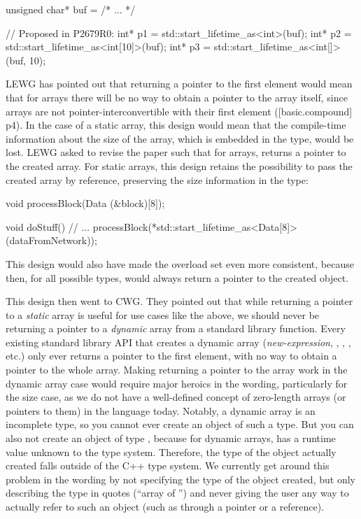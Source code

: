 \begin{codeblock}
unsigned char* buf = /* ... */

// Proposed in P2679R0:
int* p1 = std::start_lifetime_as<int>(buf);
int* p2 = std::start_lifetime_as<int[10]>(buf);
int* p3 = std::start_lifetime_as<int[]>(buf, 10);
\end{codeblock}

LEWG has pointed out that returning a pointer to the first element would mean that for arrays there will be no way to obtain a pointer to the array itself, since arrays are not pointer-interconvertible with their first element ([basic.compound] p4). In the case of a static array, this design would mean that the compile-time information about the size of the array, which is embedded in the type, would be lost. LEWG asked to revise the paper such that for arrays, \mbox{} returns a pointer to the created array. For static arrays, this design retains the possibility to pass the created array by reference, preserving the size information in the type:

\pagebreak %

\begin{codeblock}
void processBlock(Data (&block)[8]);

void doStuff() {
  // ...
  processBlock(*std::start_lifetime_as<Data[8]>(dataFromNetwork));
}
\end{codeblock}

This design would also have made the overload set even more consistent, because then, for all possible types, \mbox{} would always return a pointer to the created object.

This design then went to CWG. They pointed out that while returning a pointer to a \emph{static} array is useful for use cases like the above, we should never be returning a pointer to a \emph{dynamic} array from a standard library function. Every existing standard library API that creates a dynamic array (\emph{new-expression}, , , , etc.) only ever returns a pointer to the first element, with no way to obtain a pointer to the whole array. Making returning a pointer to the array work in the dynamic array case would require major heroics in the wording, particularly for the size  case, as we do not have a well-defined concept of zero-length arrays (or pointers to them) in the language today. Notably, a dynamic array  is an incomplete type, so you cannot ever create an object of such a type. But you can also not create an object of type , because for dynamic arrays,  has a runtime value unknown to the type system. Therefore, the type of the object actually created falls outside of the C++ type system. We currently get around this problem in the wording by not specifying the type of the object created, but only describing the type in quotes (``array of  '') and never giving the user any way to actually refer to such an object (such as through a pointer or a reference).

